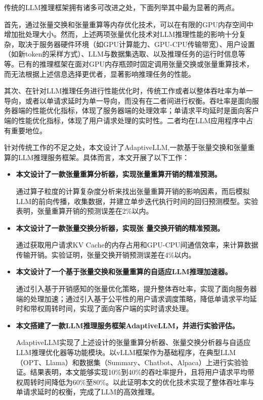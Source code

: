\par
传统的LLM推理框架拥有诸多可改进之处，下面列举其中最为显著的两点。 
\par
首先，通过张量交换和张量重算等内存优化技术，可以在有限的GPU内存空间中增加批处理大小。然而，上述两项张量优化技术对LLM推理性能的影响十分复杂，取决于服务器硬件环境（如GPU计算能力、GPU-CPU传输带宽）、用户设置（如新token的采样方式）、LLM与数据集选取、以及推理任务的运行时信息等等。已有的推理框架\cite{Swapping, vLLM, ORCA}在面对GPU内存瓶颈时固定调用张量交换或张量重算技术，而无法根据上述信息选择更优者，显著影响推理任务的性能。 
\par
其次、在针对LLM推理任务进行性能优化时，传统工作\cite{Swapping, vLLM, SpecInfer}或者以整体吞吐率为单一导向，或者以单请求延时为单一导向，而没有在二者间进行权衡。吞吐率是面向服务器端的性能优化指标，体现了服务器端的处理效率；单请求平均延时是面向客户端的性能优化指标，体现了用户请求处理的实时性。二者均在LLM应用程序中占有重要地位。
\par
针对传统工作的不足之处，本文设计了AdaptiveLLM,一款基于张量交换和张量重算的LLM推理服务框架。具体而言，本文开展了以下工作：

\begin{itemize} 
    \item { \textbf{本文设计了一款张量重算分析器，实现张量重算开销的精准预测。} 
    \setlength{\parindent}{2em} \par
    通过算子粒度的计算复杂度分析来找出张量重算开销的影响因素，而后模拟LLM的前向传播，收集数据，并建立单步迭代执行时间的回归预测模型。实验表明，张量重算开销的预测误差在2\%以内。}
    \item \textbf{本文设计了一款张量交换分析器，实现张 量交换开销的精准预测。}
    \setlength{\parindent}{2em} \par
    通过获取用户请求KV Cache的内存占用和GPU-CPU间通信效率，来计算数据传输开销。实验证明，张量交换开销预测误差在4\%以内。  
    \item \textbf{本文设计了一个基于张量交换和张量重算的自适应LLM推理加速器。}
    \setlength{\parindent}{2em} \par
    通过引入基于开销感知的张量优化策略，提升整体吞吐率，实现了面向服务器端的处理加速；通过引入基于公平性的用户请求调度策略，降低单请求平均延时和带权周转时间，实现了面向客户端的实时请求处理。
    \item \textbf{本文搭建了一款LLM推理服务框架AdaptiveLLM，并进行实验评估。}
    \setlength{\parindent}{2em} \par
    AdaptiveLLM实现了上述设计的张量重算分析器、张量交换分析器与自适应LLM推理优化器等功能模块。以vLLM框架作为基础程序，在典型LLM（OPT\cite{OPT}、Llama\cite{Llama}）和数据集（Summary\cite{Summary}、Chatbot\cite{Chatbot}、Alpaca\cite{Alpaca}）上进行实验验证。结果表明，本文能够实现10\%到40\%的吞吐率提升，且将用户请求平均带权周转时间降低为60\%至80\%。以此证明本文的优化技术实现了整体吞吐率与单请求延时的权衡，完成了LLM的高效推理。
\end{itemize}